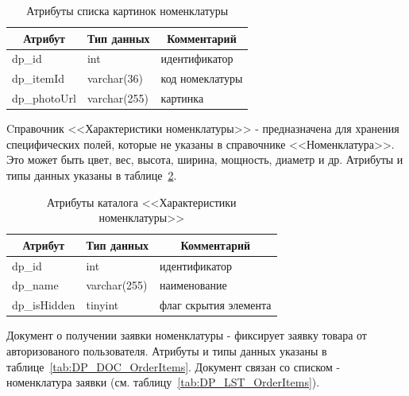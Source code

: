 \begin{table}[!htb]
    \centering\small

    \caption{Атрибуты списка картинок номенклатуры}
    \label{tab:DP_LST_ItemGalery}

    \begin{tabular}{|p{5cm}|p{2.5cm}|p{9cm}|}
        \hline
        \multicolumn{1}{|c|}{Атрибут}
        & \multicolumn{1}{c|}{Тип данных}
        & \multicolumn{1}{c|}{Комментарий}
        \\ \hline

        dp\_id & int & идентификатор \\ \hline
        dp\_itemId & varchar(36) & код номеклатуры \\ \hline
        dp\_photoUrl & varchar(255) & картинка \\ \hline
    \end{tabular}
\end{table}

Cправочник <<Характеристики номенклатуры>> - предназначена для хранения специфических полей,
которые не указаны в справочнике <<Номенклатура>>.
Это может быть цвет, вес, высота, ширина, мощность, диаметр и др.
Атрибуты и типы данных указаны в таблице~\ref{tab:DP_CTL_Characteristics}.

\begin{table}[!htb]
    \centering\small

    \caption{Атрибуты каталога <<Характеристики номенклатуры>>}
    \label{tab:DP_CTL_Characteristics}

    \begin{tabular}{|p{5cm}|p{2.5cm}|p{9cm}|}
        \hline
        \multicolumn{1}{|c|}{Атрибут}
        & \multicolumn{1}{c|}{Тип данных}
        & \multicolumn{1}{c|}{Комментарий}
        \\ \hline

        dp\_id & int & идентификатор \\ \hline
        dp\_name & varchar(255) & наименование \\ \hline
        dp\_isHidden & tinyint & флаг скрытия элемента \\ \hline
    \end{tabular}
\end{table}

Документ о получении заявки номенклатуры - фиксирует заявку товара от авторизованого пользователя.
Атрибуты и типы данных указаны в таблице~\ref{tab:DP_DOC_OrderItems}.
Документ связан со списком - номенклатура заявки (см. таблицу~\ref{tab:DP_LST_OrderItems}).

